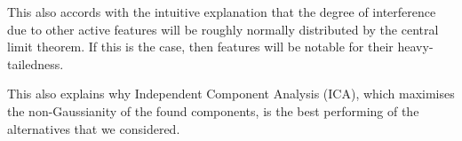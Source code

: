 This also accords with the intuitive explanation that the degree of interference due to other active features will be roughly normally distributed by the central limit theorem. If this is the case, then features will be notable for their heavy-tailedness.

This also explains why Independent Component Analysis (ICA), which maximises the non-Gaussianity of the found components, is the best performing of the alternatives that we considered.
